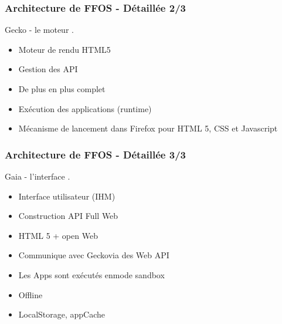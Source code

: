 \documentclass{beamer}
\begin{document}
\begin{frame}
\frametitle{Architecture de FFOS - Détaillée 2/3}
\begin{block}{Gecko - le moteur}
.
\begin{itemize}
\item Moteur de rendu HTML5
\item Gestion des API
\item De plus en plus complet
\item Exécution des applications (runtime)
\item Mécanisme de lancement dans Firefox pour HTML 5, CSS et Javascript
\end{itemize}
\end{block}
\end{frame}

\begin{frame}
\frametitle{Architecture de FFOS - Détaillée 3/3}
\begin{block}{Gaia - l'interface}
.
\begin{itemize}
\item Interface utilisateur (IHM)
\item Construction API Full Web
\item HTML 5 + open Web
\item Communique avec Geckovia des Web API
\item Les Apps sont exécutés enmode sandbox
\item Offline
\item LocalStorage, appCache
\end{itemize}
\end{block}
\end{frame}
\end{document}
